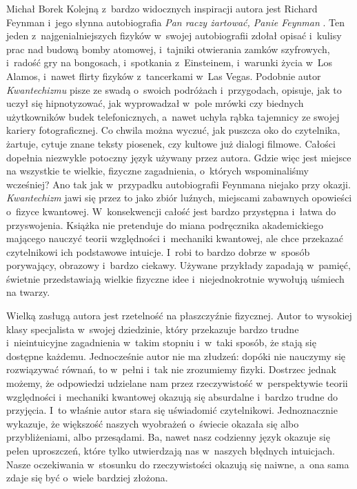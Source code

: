 \begin{newrevplenv}{Michał Borek}
Kolejną z~bardzo widocznych inspiracji autora jest Richard Feynman i~jego słynna autobiografia \textit{Pan raczy żartować, Panie Feynman}
\parencite*[][]{feynman_pan_1996}. %
 Ten jeden z~najgenialniejszych fizyków w~swojej autobiografii zdołał opisać i~kulisy prac nad budową bomby atomowej, i~tajniki otwierania zamków szyfrowych, i~radość gry na bongosach, i~spotkania z~Einsteinem, i~warunki życia w~Los Alamos, i~nawet flirty fizyków z~tancerkami w~Las Vegas. Podobnie autor \textit{Kwantechizmu} pisze ze swadą o~swoich podróżach i~przygodach, opisuje, jak to uczył się hipnotyzować, jak wyprowadzał w~pole mrówki czy biednych użytkowników budek telefonicznych, a~nawet uchyla rąbka tajemnicy ze swojej kariery fotograficznej. Co chwila można wyczuć, jak puszcza oko do czytelnika, żartuje, cytuje znane teksty piosenek, czy kultowe już dialogi filmowe. Całości dopełnia niezwykle potoczny język używany przez autora. Gdzie więc jest miejsce na wszystkie te wielkie, fizyczne zagadnienia, o~których wspominaliśmy wcześniej? Ano tak jak w~przypadku autobiografii Feynmana niejako przy okazji. \textit{Kwantechizm} jawi się przez to jako zbiór luźnych, miejscami zabawnych opowieści o~fizyce kwantowej. W~konsekwencji całość jest bardzo przystępna i~łatwa do przyswojenia. Książka nie pretenduje do miana podręcznika akademickiego mającego nauczyć teorii względności i~mechaniki kwantowej, ale chce przekazać czytelnikowi ich podstawowe intuicje. I~robi to bardzo dobrze w~sposób porywający, obrazowy i~bardzo ciekawy. Używane przykłady zapadają w~pamięć, świetnie przedstawiają wielkie fizyczne idee i~niejednokrotnie wywołują uśmiech na twarzy.

Wielką zasługą autora jest rzetelność na płaszczyźnie fizycznej. Autor to wysokiej klasy specjalista w~swojej dziedzinie, który przekazuje bardzo trudne i~nieintuicyjne zagadnienia w~takim stopniu i~w~taki sposób, że stają się dostępne każdemu. Jednocześnie autor nie ma złudzeń: dopóki nie nauczymy się rozwiązywać równań, to w~pełni i~tak nie zrozumiemy fizyki. Dostrzec jednak możemy, że odpowiedzi udzielane nam przez rzeczywistość w~perspektywie teorii względności i~mechaniki kwantowej okazują się absurdalne i~bardzo trudne do przyjęcia. I~to właśnie autor stara się uświadomić czytelnikowi. Jednoznacznie wykazuje, że większość naszych wyobrażeń o~świecie okazała się albo przybliżeniami, albo przesądami. Ba, nawet nasz codzienny język okazuje się pełen uproszczeń, które tylko utwierdzają nas w~naszych błędnych intuicjach. Nasze oczekiwania w~stosunku do rzeczywistości okazują się naiwne, a~ona sama zdaje się być o~wiele bardziej złożona.


\end{newrevplenv}
